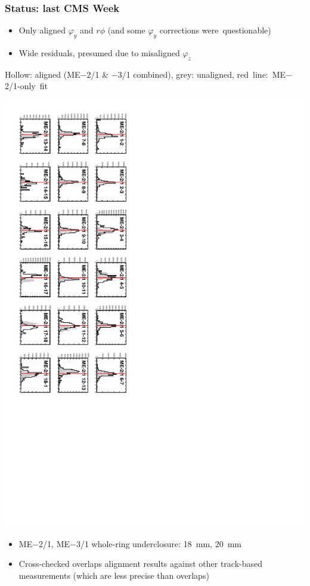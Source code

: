 \documentclass[compress]{beamer}
\begin{document}
\begin{frame}
\frametitle{Status: last CMS Week}
\begin{itemize}
\item Only aligned $\varphi_y$ and $r\phi$ (and some $\varphi_y$ corrections \mbox{were questionable)\hspace{-1 cm}}
\item Wide residuals, presumed due to misaligned $\varphi_z$
\end{itemize}

\vfill
{\scriptsize Hollow: aligned (ME$-$2/1 \& $-$3/1 combined), grey: unaligned, \mbox{red line: ME$-$2/1-only fit\hspace{-1 cm}}}

\vspace{0.2 cm}
\includegraphics[height=\linewidth, angle=90]{final_checkresids_half.pdf}

\vfill
\begin{itemize}
\item ME$-$2/1, ME$-$3/1 whole-ring underclosure: 18~mm, 20~mm
\item Cross-checked overlaps alignment results against other track-based measurements (which are less precise than overlaps)
\end{itemize}
\end{frame}
\end{document}
